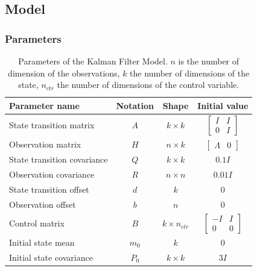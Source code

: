 \documentclass{article}
\let\Oldsubsection\subsection
\renewcommand{\subsection}{\FloatBarrier\Oldsubsection}
\begin{document}
\subsection{Model}

\subsubsection{Parameters}

\begin{table}
\caption{Parameters of the Kalman Filter Model. $n$ is the number of dimension of the observations, $k$ the number of dimensions of the state, $n_{ctr}$ the number of dimensions of the control variable.}
\label{table:parameters}
\vspace{5pt}
\centering
\begin{tabular}{l c c c}
\toprule
    \bfseries Parameter name & \bfseries Notation & \bfseries Shape & \bfseries Initial value\\
    \hline
    \noalign{\vspace{4pt}}
    State transition matrix & $A$ & $k \times k$ & $\begin{bmatrix}I & I \\ 0 & I\end{bmatrix}$ \\
    \noalign{\vspace{4pt}}
    Observation matrix & $H$ & $n \times k$ & $\begin{bmatrix}\Lambda & 0 \end{bmatrix}$ \\
    State transition covariance & $Q$ & $k \times k$ & $0.1 I$ \\
    Observation covariance & $R$ & $n \times n$ & $0.01 I$\\
    State transition offset & $d$ & $k$ & 0 \\
    Observation offset & $b$ & $n$ & 0 \\
    Control matrix & $B$ & $k \times n_{ctr}$ & $\begin{bmatrix} -I & I \\ 0 & 0 \end{bmatrix}$ \\
    Initial state mean & $m_0$ & $k$ & $0$ \\
    Initial state covariance & $P_0$ & $k \times k$ & $3 I$ \\
\bottomrule
\end{tabular}
\end{table}
\end{document}
